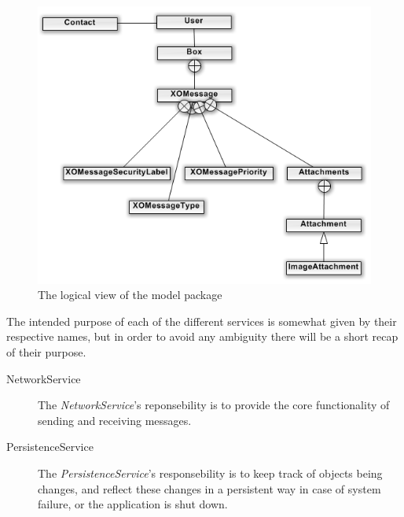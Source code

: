 \begin{figure}[H]
	\includegraphics[width=\textwidth]{modelPackage.png}
	\caption{The logical view of the model package}
	\label{fig:logicalmodelpackview}
\end{figure}

The intended purpose of each of the different services is somewhat given by their respective names, but in order to avoid any ambiguity there will be a short recap of their purpose.
\begin{description}
	\item[NetworkService] The \textit{NetworkService}'s reponsebility is to provide the core functionality of sending and receiving messages. 
	\item[PersistenceService] The \textit{PersistenceService}'s responsebility is to keep track of objects being changes, and reflect these changes in a persistent way in case of system failure, or the application is shut down. 
\end{description}

